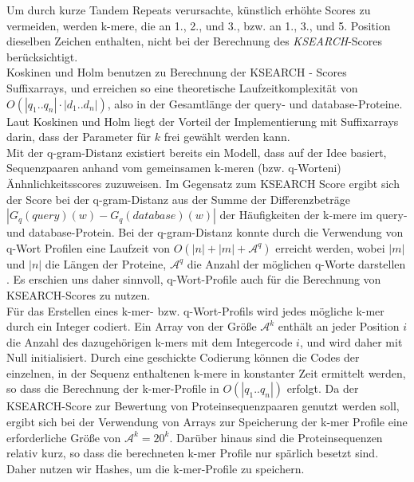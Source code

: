 \documentclass{article}
\begin{document}
Um durch kurze Tandem Repeats verursachte, künstlich erhöhte Scores zu vermeiden, werden k-mere, die an 1., 2., und 3., bzw. an 1., 3., und 5. Position dieselben Zeichen enthalten, nicht bei der Berechnung des \emph{KSEARCH}-Scores berücksichtigt.\\
Koskinen und Holm benutzen zu Berechnung der KSEARCH - Scores Suffixarrays, und erreichen so eine theoretische Laufzeitkomplexität von $O(|q_1..q_n| \cdot |d_1..d_n|)$, also in der Gesamtlänge der query- und database-Proteine. Laut Koskinen und Holm liegt der Vorteil der Implementierung mit Suffixarrays darin, dass der Parameter für $k$ frei gewählt werden kann. \\
Mit der q-gram-Distanz existiert bereits ein Modell, dass auf der Idee basiert,
Sequenzpaaren anhand vom gemeinsamen k-meren (bzw. q-Worteni) Änhnlichkeits\-scores zuzuweisen. 
Im Gegensatz zum KSEARCH Score ergibt sich der Score bei der q-gram-Distanz aus der Summe der Differenzbeträge $|G_q(query)(w) - G_q(database)(w)|$ der Häufigkeiten der k-mere im query- und database-Protein. 
Bei der q-gram-Distanz konnte durch die Verwendung von q-Wort Profilen eine
Laufzeit von $O(|n|+|m|+\mathcal{A}^q)$ erreicht werden, wobei $|m|$ und $|n|$
die Längen der Proteine, $\mathcal{A}^q$ die Anzahl der möglichen q-Worte
darstellen \cite{GSA}. Es erschien uns daher sinnvoll, q-Wort-Profile auch für die Berechnung von KSEARCH-Scores zu nutzen.\\
Für das Erstellen eines k-mer- bzw. q-Wort-Profils wird jedes mögliche k-mer durch ein Integer codiert. Ein Array von der Größe $\mathcal{A}^k$ enthält an jeder Position $i$ die Anzahl des dazugehörigen k-mers mit dem Integercode $i$, und wird daher mit Null initialisiert. Durch eine geschickte Codierung können die Codes der einzelnen, in der Sequenz enthaltenen k-mere in konstanter Zeit ermittelt werden, so dass die Berechnung der k-mer-Profile in ${O(|q_1..q_n|)}$ erfolgt. Da der KSEARCH-Score zur Bewertung von Proteinsequenzpaaren genutzt werden soll, ergibt sich bei der Verwendung von Arrays zur Speicherung der k-mer Profile eine erforderliche Größe von $\mathcal{A}^k = 20^k$. Darüber hinaus sind die Proteinsequenzen relativ kurz, so dass die berechneten k-mer Profile nur spärlich besetzt sind. Daher nutzen wir Hashes, um die k-mer-Profile zu speichern. \\
\end{document}
